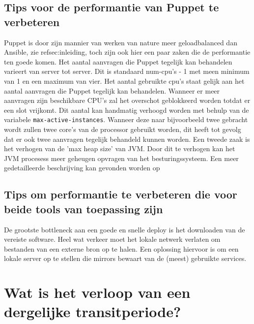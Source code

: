  \subsection{Tips voor de performantie van Puppet te verbeteren}
 Puppet is door zijn mannier van werken van nature meer geloadbalanced dan Ansible, zie ref{sec:inleiding}, toch zijn ook hier een paar zaken die de performantie ten goede komen. Het aantal aanvragen die Puppet tegelijk kan behandelen varieert van server tot server. Dit is standaard num-cpu's - 1 met meen minimum van 1 en een maximum van vier. Het aantal gebruikte cpu's staat gelijk aan het aantal aanvragen die Puppet tegelijk kan behandelen. Wanneer er meer aanvragen zijn beschikbare CPU's zal het overschot geblokkeerd worden totdat er een slot vrijkomt. Dit aantal kan handmatig verhoogd worden met behulp van de variabele \texttt{max-active-instances}. Wanneer deze naar bijvoorbeeld twee gebracht wordt zullen twee core's van de processor gebruikt worden, dit heeft tot gevolg dat er ook twee aanvragen tegelijk behandeld kunnen worden. \newline
 Een tweede zaak is het verhogen van de 'max heap size' van JVM. Door dit te verhogen kan het JVM procesess meer geheugen opvragen van het besturingssysteem. Een meer gedetailleerde beschrijving kan gevonden worden op \textcite{PuppetTuning}
 
 
 \subsection{Tips om performantie te verbeteren die voor beide tools van toepassing zijn}
 De grootste bottleneck aan een goede en snelle deploy is het downloaden van de vereiste software. Heel wat verkeer moet het lokale netwerk verlaten om bestanden van een externe bron op te halen. Een oplossing hiervoor is om een lokale server op te stellen die mirrors bewaart van de (meest) gebruikte services. \autocite{AnsibleTuning}

 
 
 
 
 
\section{Wat is het verloop van een dergelijke transitperiode?}
\label{sec:methodologie-verloop-transit}









